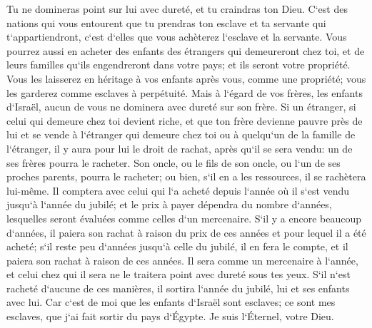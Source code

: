 \verse Tu ne domineras point sur lui avec dureté, et tu craindras ton Dieu. 
\verse C`est des nations qui vous entourent que tu prendras ton esclave et ta servante qui t`appartiendront, c`est d`elles que vous achèterez l`esclave et la servante. 
\verse Vous pourrez aussi en acheter des enfants des étrangers qui demeureront chez toi, et de leurs familles qu`ils engendreront dans votre pays; et ils seront votre propriété. 
\verse Vous les laisserez en héritage à vos enfants après vous, comme une propriété; vous les garderez comme esclaves à perpétuité. Mais à l`égard de vos frères, les enfants d`Israël, aucun de vous ne dominera avec dureté sur son frère. 
\verse Si un étranger, si celui qui demeure chez toi devient riche, et que ton frère devienne pauvre près de lui et se vende à l`étranger qui demeure chez toi ou à quelqu`un de la famille de l`étranger, 
\verse il y aura pour lui le droit de rachat, après qu`il se sera vendu: un de ses frères pourra le racheter. 
\verse Son oncle, ou le fils de son oncle, ou l`un de ses proches parents, pourra le racheter; ou bien, s`il en a les ressources, il se rachètera lui-même. 
\verse Il comptera avec celui qui l`a acheté depuis l`année où il s`est vendu jusqu`à l`année du jubilé; et le prix à payer dépendra du nombre d`années, lesquelles seront évaluées comme celles d`un mercenaire. 
\verse S`il y a encore beaucoup d`années, il paiera son rachat à raison du prix de ces années et pour lequel il a été acheté; 
\verse s`il reste peu d`années jusqu`à celle du jubilé, il en fera le compte, et il paiera son rachat à raison de ces années. 
\verse Il sera comme un mercenaire à l`année, et celui chez qui il sera ne le traitera point avec dureté sous tes yeux. 
\verse S`il n`est racheté d`aucune de ces manières, il sortira l`année du jubilé, lui et ses enfants avec lui. 
\verse Car c`est de moi que les enfants d`Israël sont esclaves; ce sont mes esclaves, que j`ai fait sortir du pays d`Égypte. Je suis l`Éternel, votre Dieu. 

